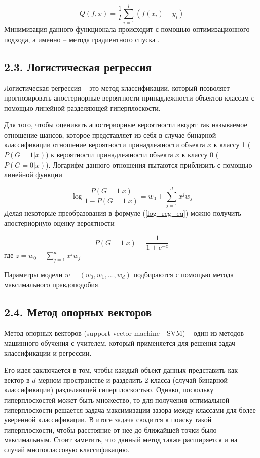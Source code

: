 $$Q(f, x) = \frac{1}{l}\sum_{i=1}^{l} (f(x_i) - y_i)$$
Минимизация данного функционала происходит с помощью оптимизационного подхода, а именно -- метода градиентного спуска \cite{gradient descent}.

\subsection{2.3. Логистическая регрессия}
Логистическая регрессия \cite{logistic regression} -- это метод классификации, который позволяет прогнозировать апостериорные вероятности принадлежности объектов классам с помощью линейной разделяющей гиперплоскости. 

Для того, чтобы оценивать апостериорные вероятности вводят так называемое отношение шансов, которое представляет из себя в случае бинарной классификации отношение вероятности принадлежности объекта $x$ к классу 1 ($P(G=1|x)$) к вероятности принадлежности объекта $x$ к классу 0 ($P(G=0|x)$). Логарифм данного отношения пытаются приблизить с помощью линейной функции

\begin{equation}\label{log_reg_eq}
\log \frac{P(G=1|x)}{1 - P(G=1|x)} = w_0 + \sum_{j=1}^{d}x^j w_j
\end{equation}
Делая некоторые преобразования в формуле  (\ref{log_reg_eq}) можно получить апостериорную оценку вероятности

$$P(G=1|x) = \frac{1}{1 + e^{-z}}$$
где $z = w_0 + \sum_{j=1}^{d}x^j w_j$

Параметры модели $w = (w_0, w_1, ... ,w_d)$ подбираются с помощью метода максимального правдоподобия.

\subsection{2.4. Метод опорных векторов}
Метод опорных векторов (support vector machine - SVM) \cite{svm}-- один из методов машинного обучения с учителем, который применяется для решения задач классификации и регрессии. 

Его идея заключается в том, чтобы каждый объект данных представить как вектор в $d$-мерном пространстве и разделить 2 класса (случай бинарной классификации) разделяющей гиперплоскостью. Однако, поскольку
гиперплоскостей может быть множество, то для получения оптимальной гиперплоскости решается задача максимизации зазора между классами для более уверенной классификации. В итоге задача сводится к поиску такой гиперплоскости, чтобы расстояние от нее до ближайшей точки было максимальным. Стоит заметить, что данный метод также расширяется и на случай многоклассовую классификацию.

